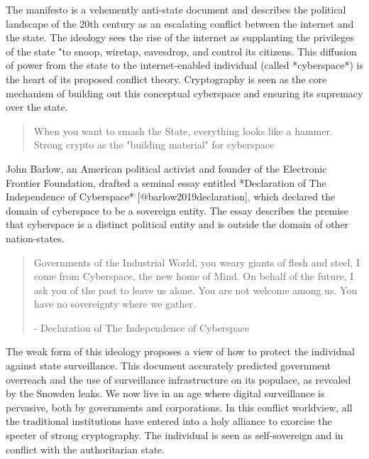 The manifesto is a vehemently anti-state document and describes the political
landscape of the 20th century as an escalating conflict between the internet and
the state. The ideology sees the rise of the internet as supplanting the
privileges of the state "to snoop, wiretap, eavesdrop, and control its citizens.
This diffusion of power from the state to the internet-enabled individual
(called *cyberspace*) is the heart of its proposed conflict theory. Cryptography
is seen as the core mechanism of building out this conceptual cyberspace and
ensuring its supremacy over the state.

\begin{quote}
When you want to smash the State, everything looks like a hammer.
Strong crypto as the "building material" for cyberspace
\end{quote}

John Barlow, an American political activist and founder of the Electronic
Frontier Foundation, drafted a seminal essay entitled *Declaration of The
Independence of Cyberspace* [@barlow2019declaration], which declared the domain
of cyberspace to be a sovereign entity. The essay describes the premise that
cyberspace is a distinct political entity and is outside the domain of other
nation-states.

\begin{quote}
Governments of the Industrial World, you weary giants of flesh and steel, I come
from Cyberspace, the new home of Mind. On behalf of the future, I ask you of
 the past to leave us alone. You are not welcome among us. You have no
sovereignty where we gather.
\begin{flushright}
- Declaration of The Independence of Cyberspace
\end{flushright}
\end{quote}

The weak form of this ideology proposes a view of how to protect the individual
against state surveillance. This document accurately predicted government
overreach and the use of surveillance infrastructure on its populace, as
revealed by the Snowden leaks. We now live in an age where digital surveillance
is pervasive, both by governments and corporations. In this conflict worldview,
all the traditional institutions have entered into a holy alliance to exorcise
the specter of strong cryptography. The individual is seen as self-sovereign and
in conflict with the authoritarian state.


